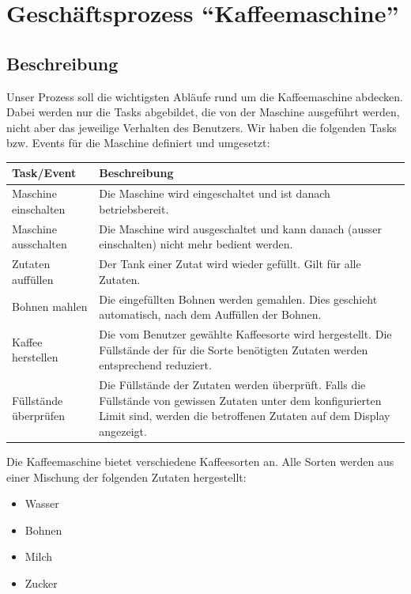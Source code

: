 \chapter{Geschäftsprozess ``Kaffeemaschine''}\label{ch:business-process}


\section{Beschreibung}\label{sec:beschreibung}
Unser Prozess soll die wichtigsten Abläufe rund um die Kaffeemaschine abdecken.
Dabei werden nur die Tasks abgebildet, die von der Maschine ausgeführt werden, nicht aber das jeweilige Verhalten des Benutzers.
Wir haben die folgenden Tasks bzw. Events für die Maschine definiert und umgesetzt:

\begin{longtable}{|p{}|p{}|}
    \hline
    \textbf{Task/Event} & \textbf{Beschreibung}
    \\ \hline
    Maschine einschalten & Die Maschine wird eingeschaltet und ist danach betriebsbereit.
    \\ \hline
    Maschine ausschalten & Die Maschine wird ausgeschaltet und kann danach (ausser einschalten) nicht mehr bedient werden.
    \\ \hline
    Zutaten auffüllen & Der Tank einer Zutat wird wieder gefüllt.
    Gilt für alle Zutaten.
    \\ \hline
    Bohnen mahlen & Die eingefüllten Bohnen werden gemahlen.
    Dies geschieht automatisch, nach dem Auffüllen der Bohnen.
    \\ \hline
    Kaffee herstellen & Die vom Benutzer gewählte Kaffeesorte wird hergestellt.
    Die Füllstände der für die Sorte benötigten Zutaten werden entsprechend reduziert.
    \\ \hline
    Füllstände überprüfen & Die Füllstände der Zutaten werden überprüft.
    Falls die Füllstände von gewissen Zutaten unter dem konfigurierten Limit sind, werden die betroffenen Zutaten auf dem Display angezeigt.
    \\ \hline
\end{longtable}\label{tab:tasks}


Die Kaffeemaschine bietet verschiedene Kaffeesorten an.
Alle Sorten werden aus einer Mischung der folgenden Zutaten hergestellt:
\begin{itemize}
    \item Wasser
    \item Bohnen
    \item Milch
    \item Zucker
\end{itemize}

